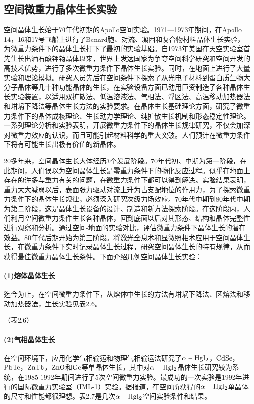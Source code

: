 \subsection{空间微重力晶体生长实验}
空间晶体生长始于70年代初期的Apollo空间实验。1971---1973年期间，在Apollo 14，16和17号飞船上进行了Benard胞、对流、凝固和复合物材料晶体生长实验，为微重力条件下的晶体生长打下了最初的实验基础。自1973年美国在天空实验室首先生长出酒石酸钾钠晶体以来，世界上发达国家为争夺空间科学研究和空间开发的高技术优势，进行了多次微重力条件下晶体生长实验。同时，在地面上进行了大量实验和理论模拟。研究人员先后在空间条件下探索了从光电子材料到蛋白质生物大分子晶体等几十种功能晶体的生长，在实验设备方面已动用巨资制造了各种晶体生长实验装置，以适用双扩散法、低温溶液法、气相法、浮区法、高温移动加热器法和坩埚下降法等晶体生长方法的实验要求。在晶体生长基础理论方面，研究了微重力条件下的晶体成核理论、生长动力学理论、纯扩散生长机制和形态稳定性理论。一系列理论分析和实验表明，开展微重力条件下的晶体生长规律研究，不仅会加深对微重力效应的认识，而且可能引起材料科学的重大突破。人们预计在微重力条件下将有可能生长出极有价值的新晶体。

20多年来，空间晶体生长大体经历3个发展阶段。70年代初、中期为第一阶段，在此期间，人们误以为空间晶体生长是零重力条件下的物化反应过程。似乎在地面上存在的许多与重力有关的问题，在微重力条件下都可以得到解决。实验结果表明，重力大大减弱以后，表面张力驱动对流上升为占支配地位的作用力，为了探索微重力条件下的晶体生长规律，必须深入研究次级力场效应。70年代中期到80年代中期为第二阶段，这是晶体生长设备的设计、制造和新方法探索阶段。在这阶段内，人们利用空间微重力条件生长各种晶体，回到底面以后对其形态、结构和晶体完整性进行观察和分析。通过空间-地面的实验对比，评估微重力条件下晶体生长的潜在效益。80年代后期开始为第三阶段。将激光全息术和显微照相术应用于空间晶体生长，在微重力条件下实时记录晶体生长过程，研究空间晶体生长的特有规律，从而获得最佳微重力晶体生长条件。下面介绍几例空间晶体生长实验：

\paragraph{(1)熔体晶体生长}迄今为止，在空间微重力条件下，从熔体中生长的方法有坩埚下降法、区熔法和移动加热器法，生长实验见表2.6。

（表2.6）

\paragraph{(2)气相晶体生长}在空间环境下，应用化学气相输运和物理气相输运法研究了$\rm\alpha-HgI_2$，$\rm CdSe$，$\rm PbTe$，$\rm ZnTb$，$\rm ZnO$和$\rm Ge$等单晶体生长，其中对$\rm\alpha-HgI_2$晶体生长研究较为系统，在1985-1992年期间进行了5次空间微重力实验。最成功的一次实验是1992年进行的国际微重力实验室（IML-1）实验。据报道，在空间所获得的$\rm\alpha-HgI_2$单晶体的尺寸和性能都很理想。表2.7是几次$\rm\alpha-HgI_2$空间实验条件和结果。

